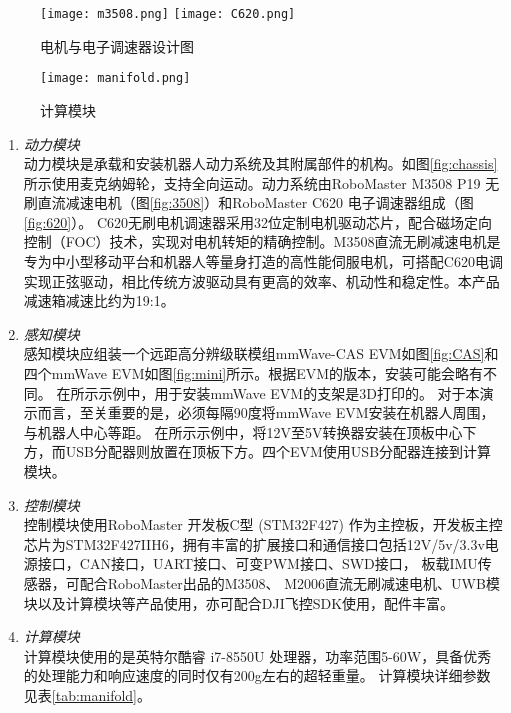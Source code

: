 \documentclass[lang=cn,11pt,a4paper]{elegantpaper}
\begin{document}
\begin{figure}
  \centering
  {\texttt{[image: m3508.png]}}
  {\texttt{[image: C620.png]}}
  \caption{电机与电子调速器设计图}\label{ele}
\end{figure}

\begin{figure}[htbp]
  \centering
  \texttt{[image: manifold.png]}
  \caption{计算模块}
  \label{fig:manifold}
\end{figure}

\begin{enumerate}[label=\arabic*).]
  \item \textit{动力模块}\\
      动力模块是承载和安装机器人动力系统及其附属部件的机构。如图\ref{fig:chassis}所示使用麦克纳姆轮，支持全向运动。动力系统由RoboMaster M3508 P19 无刷直流减速电机（图\ref{fig:3508}）和RoboMaster C620 电子调速器组成（图\ref{fig:620}）。
      C620无刷电机调速器采用32位定制电机驱动芯片，配合磁场定向控制（FOC）技术，实现对电机转矩的精确控制。M3508直流无刷减速电机是专为中小型移动平台和机器人等量身打造的高性能伺服电机，可搭配C620电调实现正弦驱动，相比传统方波驱动具有更高的效率、机动性和稳定性。本产品减速箱减速比约为19:1。
  \item \textit{感知模块}\\
      感知模块应组装一个远距高分辨级联模组mmWave-CAS EVM如图\ref{fig:CAS}和四个mmWave EVM如图\ref{fig:mini}所示。根据EVM的版本，安装可能会略有不同。
      在所示示例中，用于安装mmWave EVM的支架是3D打印的。
      对于本演示而言，至关重要的是，必须每隔90度将mmWave EVM安装在机器人周围，与机器人中心等距。
      在所示示例中，将12V至5V转换器安装在顶板中心下方，而USB分配器则放置在顶板下方。四个EVM使用USB分配器连接到计算模块。
  \item \textit{控制模块}\\
      控制模块使用RoboMaster 开发板C型 (STM32F427) 作为主控板，开发板主控芯片为STM32F427IIH6，拥有丰富的扩展接口和通信接口包括12V/5v/3.3v电源接口，CAN接口，UART接口、可变PWM接口、SWD接口，
      板载IMU传感器，可配合RoboMaster出品的M3508、 M2006直流无刷减速电机、UWB模块以及计算模块等产品使用，亦可配合DJI飞控SDK使用，配件丰富。
  \item \textit{计算模块}\\
  计算模块使用的是英特尔酷睿 i7-8550U 处理器，功率范围5-60W，具备优秀的处理能力和响应速度的同时仅有200g左右的超轻重量。
  计算模块详细参数见表\ref{tab:manifold}。
\end{enumerate}
\end{document}
